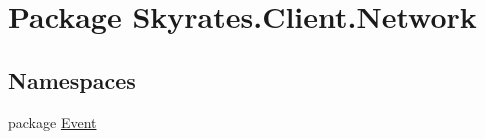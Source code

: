 \hypertarget{namespace_skyrates_1_1_client_1_1_network}{\section{Package Skyrates.\-Client.\-Network}
\label{namespace_skyrates_1_1_client_1_1_network}
}
\subsection*{Namespaces}
\begin{DoxyCompactItemize}
\item 
package \hyperlink{namespace_skyrates_1_1_client_1_1_network_1_1_event}{Event}
\end{DoxyCompactItemize}
